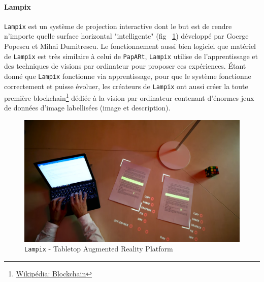 \paragraph{Lampix} \texttt{Lampix} est un système de projection interactive dont le but est de rendre n'importe quelle surface horizontal "intelligente" (fig ~\ref{fig:lampix}) développé par Goerge Popescu et Mihai Dumitrescu. Le fonctionnement aussi bien logiciel que matériel de \texttt{Lampix} est très similaire à celui de \texttt{\texttt{PapARt}}, \texttt{Lampix} utilise de l'apprentissage et des techniques de visions par ordinateur pour proposer ces expériences. Étant donné que \texttt{Lampix} fonctionne via apprentissage, pour que le système fonctionne correctement et puisse évoluer, les créateurs de \texttt{Lampix} ont aussi créer la toute première blockchain\footnote{\href{https://fr.wikipedia.org/wiki/Blockchain}{Wikipédia: Blockchain}} dédiée à la vision par ordinateur contenant d'énormes jeux de données d'image labellisées (image et description).

\begin{figure}[H]
\centering
\includegraphics[width=0.7\linewidth]{images/lampix}
\caption{\texttt{Lampix} - Tabletop Augmented Reality Platform}
\label{fig:lampix}
\end{figure} 